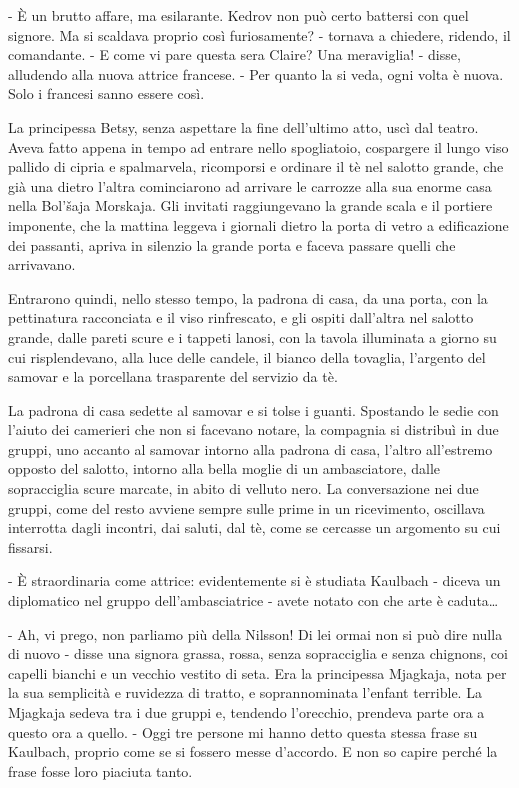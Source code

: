 - È un brutto affare, ma esilarante. Kedrov non può certo battersi con quel signore. Ma si scaldava proprio così furiosamente? - tornava a chiedere, ridendo, il comandante. - E come vi pare questa sera Claire? Una meraviglia! - disse, alludendo alla nuova attrice francese. - Per quanto la si veda, ogni volta è nuova. Solo i francesi sanno essere così. 

\label{vi-1} 

La principessa Betsy, senza aspettare la fine dell'ultimo atto, uscì dal teatro. Aveva fatto appena in tempo ad entrare nello spogliatoio, cospargere il lungo viso pallido di cipria e spalmarvela, ricomporsi e ordinare il tè nel salotto grande, che già una dietro l'altra cominciarono ad arrivare le carrozze alla sua enorme casa nella Bol'šaja Morskaja. Gli invitati raggiungevano la grande scala e il portiere imponente, che la mattina leggeva i giornali dietro la porta di vetro a edificazione dei passanti, apriva in silenzio la grande porta e faceva passare quelli che arrivavano. 

Entrarono quindi, nello stesso tempo, la padrona di casa, da una porta, con la pettinatura racconciata e il viso rinfrescato, e gli ospiti dall'altra nel salotto grande, dalle pareti scure e i tappeti lanosi, con la tavola illuminata a giorno su cui risplendevano, alla luce delle candele, il bianco della tovaglia, l'argento del samovar e la porcellana trasparente del servizio da tè. 

La padrona di casa sedette al samovar e si tolse i guanti. Spostando le sedie con l'aiuto dei camerieri che non si facevano notare, la compagnia si distribuì in due gruppi, uno accanto al samovar intorno alla padrona di casa, l'altro all'estremo opposto del salotto, intorno alla bella moglie di un ambasciatore, dalle sopracciglia scure marcate, in abito di velluto nero. La conversazione nei due gruppi, come del resto avviene sempre sulle prime in un ricevimento, oscillava interrotta dagli incontri, dai saluti, dal tè, come se cercasse un argomento su cui fissarsi. 

- È straordinaria come attrice: evidentemente si è studiata Kaulbach - diceva un diplomatico nel gruppo dell'ambasciatrice - avete notato con che arte è caduta\ldots{} 

- Ah, vi prego, non parliamo più della Nilsson! Di lei ormai non si può dire nulla di nuovo - disse una signora grassa, rossa, senza sopracciglia e senza chignons, coi capelli bianchi e un vecchio vestito di seta. Era la principessa Mjagkaja, nota per la sua semplicità e ruvidezza di tratto, e soprannominata l'enfant terrible. La Mjagkaja sedeva tra i due gruppi e, tendendo l'orecchio, prendeva parte ora a questo ora a quello. - Oggi tre persone mi hanno detto questa stessa frase su Kaulbach, proprio come se si fossero messe d'accordo. E non so capire perché la frase fosse loro piaciuta tanto. 

